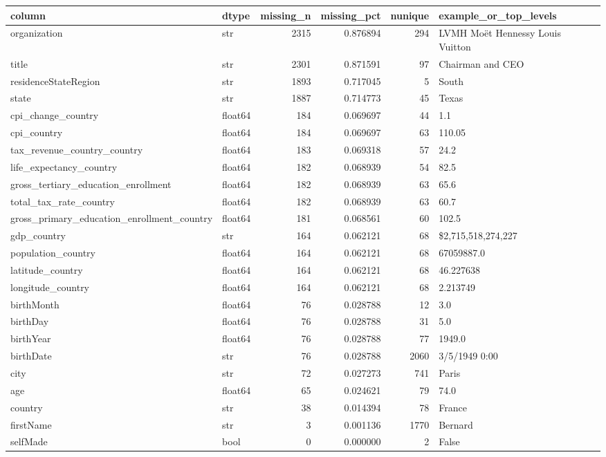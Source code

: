 \begin{tabular}{llrrrl}
\toprule
column & dtype & missing\_n & missing\_pct & nunique & example\_or\_top\_levels \\
\midrule
organization & str & 2315 & 0.876894 & 294 & LVMH Moët Hennessy Louis Vuitton \\
title & str & 2301 & 0.871591 & 97 & Chairman and CEO \\
residenceStateRegion & str & 1893 & 0.717045 & 5 & South \\
state & str & 1887 & 0.714773 & 45 & Texas \\
cpi\_change\_country & float64 & 184 & 0.069697 & 44 & 1.1 \\
cpi\_country & float64 & 184 & 0.069697 & 63 & 110.05 \\
tax\_revenue\_country\_country & float64 & 183 & 0.069318 & 57 & 24.2 \\
life\_expectancy\_country & float64 & 182 & 0.068939 & 54 & 82.5 \\
gross\_tertiary\_education\_enrollment & float64 & 182 & 0.068939 & 63 & 65.6 \\
total\_tax\_rate\_country & float64 & 182 & 0.068939 & 63 & 60.7 \\
gross\_primary\_education\_enrollment\_country & float64 & 181 & 0.068561 & 60 & 102.5 \\
gdp\_country & str & 164 & 0.062121 & 68 & \$2,715,518,274,227  \\
population\_country & float64 & 164 & 0.062121 & 68 & 67059887.0 \\
latitude\_country & float64 & 164 & 0.062121 & 68 & 46.227638 \\
longitude\_country & float64 & 164 & 0.062121 & 68 & 2.213749 \\
birthMonth & float64 & 76 & 0.028788 & 12 & 3.0 \\
birthDay & float64 & 76 & 0.028788 & 31 & 5.0 \\
birthYear & float64 & 76 & 0.028788 & 77 & 1949.0 \\
birthDate & str & 76 & 0.028788 & 2060 & 3/5/1949 0:00 \\
city & str & 72 & 0.027273 & 741 & Paris \\
age & float64 & 65 & 0.024621 & 79 & 74.0 \\
country & str & 38 & 0.014394 & 78 & France \\
firstName & str & 3 & 0.001136 & 1770 & Bernard \\
selfMade & bool & 0 & 0.000000 & 2 & False \\

\end{tabular}
